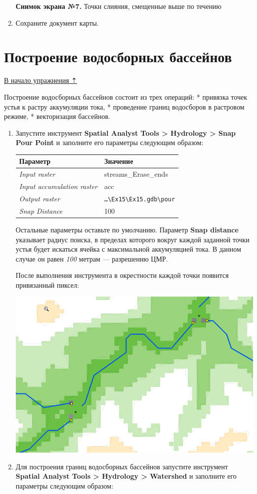 \documentclass[]{book}
\theoremstyle{definition}
\theoremstyle{definition}
\theoremstyle{definition}
\theoremstyle{remark}
\begin{document}
\begin{enumerate}
  \textbf{Снимок экрана №7.} Точки слияния, смещенные выше по течению
\item
  Сохраните документ карты.
\end{enumerate}

\hypertarget{dem-watersheds}{%
\section{Построение водосборных бассейнов}\label{dem-watersheds}}

\protect\hyperlink{dem}{В начало упражнения ⇡}

Построение водосборных бассейнов состоит из трех операций: * привязка
точек устья к растру аккумуляции тока, * проведение границ водосборов в
растровом режиме, * векторизация бассейнов.

\begin{enumerate}
\def\labelenumi{\arabic{enumi}.}
\item
  Запустите инструмент \textbf{Spatial Analyst Tools \textgreater{}
  Hydrology \textgreater{} Snap Pour Point} и заполните его параметры
  следующим образом:

  \begin{longtable}[]{@{}ll@{}}
  \toprule
  Параметр & Значение\tabularnewline
  \midrule
  \endhead
  \emph{Input raster} & streams\_Erase\_ends\tabularnewline
  \emph{Input accumulation raster} & acc\tabularnewline
  \emph{Output raster} &
  \texttt{\ldots{}\textbackslash{}Ex15\textbackslash{}Ex15.gdb\textbackslash{}pour}\tabularnewline
  \emph{Snap Distance} & 100\tabularnewline
  \bottomrule
  \end{longtable}

  Остальные параметры оставьте по умолчанию. Параметр \textbf{Snap
  distance} указывает радиус поиска, в пределах которого вокруг каждой
  заданной точки устья будет искаться ячейка с максимальной аккумуляцией
  тока. В данном случае он равен \emph{100} метрам --- разрешению ЦМР.

  После выполнения инструмента в окрестности каждой точки появится
  привязанный пиксел:

  \includegraphics{images/Ex15/image23.png}
\item
  Для построения границ водосборных бассейнов запустите инструмент
  \textbf{Spatial Analyst Tools \textgreater{} Hydrology \textgreater{}
  Watershed} и заполните его параметры следующим образом:


\end{enumerate}
\end{document}
